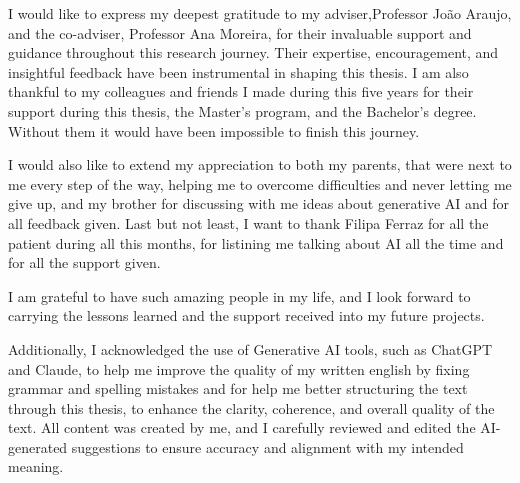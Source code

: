 
%

\begin{ntacknowledgements}
    I would like to express my deepest gratitude to my adviser,Professor João Araujo, and the co-adviser, Professor Ana Moreira, for their invaluable support and guidance throughout this research journey. Their expertise, encouragement, and insightful feedback have been instrumental in shaping this thesis. 
    I am also thankful to my colleagues and friends I made during this five years for their support during this thesis, the Master's program, and the Bachelor's degree. Without them it would have been impossible to finish this journey.
    
    I would also like to extend my appreciation to both my parents, that were next to me every step of the way, helping me to overcome difficulties and never letting me give up, and my brother for discussing with me ideas about generative AI and for all feedback given.
    Last but not least, I want to thank Filipa Ferraz for all the patient during all this months, for listining me talking about AI all the time and for all the support given.

    I am grateful to have such amazing people in my life, and I look forward to carrying the lessons learned and the support received into my future projects.

    Additionally, I acknowledged the use of Generative AI tools, such as ChatGPT and Claude, to help me improve the quality of my written english by fixing grammar and spelling mistakes and for help me better structuring the text through this thesis, to enhance the clarity, coherence, and overall quality of the text. 
    All content was created by me, and I carefully reviewed and edited the AI-generated suggestions to ensure accuracy and alignment with my intended meaning.

\end{ntacknowledgements}
